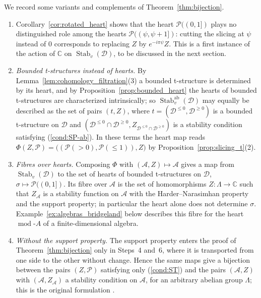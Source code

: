 \documentclass[12pt]{amsart}
\newcommand{\condref}[1]{\textup{(\ref{#1})}}
\newenvironment{remark}{{\textbf{Remark.}}}
\numberwithin{theorem}{section}
\theoremstyle{definition}
\newcommand{\CC}{\mathbb{C}}
\newcommand{\calA}{\mathcal{A}}
\newcommand{\calP}{\mathcal{P}}
\newcommand{\calD}{\mathcal{D}}
\newcommand{\Dle}[1]{\calD^{\leqslant #1}}
\newcommand{\Dge}[1]{\calD^{\geqslant #1}}
\begin{document}
	\begin{remark}
		We record some variants and complements of Theorem~\ref{thm:bijection}.
		\begin{enumerate}
			\item Corollary~\ref{cor:rotated_heart} shows that the heart $\calP((0, 1])$ plays no distinguished role among the hearts $\calP((\psi, \psi + 1])$:
			cutting the slicing at $\psi$ instead of $0$ corresponds to replacing $Z$ by $e^{-i \pi \psi} Z$.
			This is a first instance of the action of $\CC$ on $\operatorname{Stab}_v(\calD)$, to be discussed in the next section.
			\item \emph{Bounded t-structures instead of hearts.}
			By Lemma~\ref{lem:cohomology_filtration}(3) a bounded t-structure is determined by its heart, and by Proposition~\ref{prop:bounded_heart} the hearts of bounded t-structures are characterized intrinsically;
			so $\operatorname{Stab}^{\mathrm{ab}}_v(\calD)$ may equally be described as the set of pairs $(t, Z)$, where $t = (\Dle{0}, \Dge{0})$ is a bounded t-structure on $\calD$ and $(\Dle{0} \cap \Dge{0}, Z_{\Dle{0} \cap \Dge{0}})$ is a stability condition satisfying \condref{cond:SP-ab}.
			In these terms the heart map reads $\Phi(Z, \calP) = \big( (\calP(> 0), \calP(\leqslant 1)), Z \big)$ by Proposition~\ref{prop:slicing_t}(2).
			\item \emph{Fibres over hearts.}
			Composing $\Phi$ with $(\calA, Z) \mapsto \calA$ gives a map from $\operatorname{Stab}_v(\calD)$ to the set of hearts of bounded t-structures on $\calD$, $\sigma \mapsto \calP((0, 1])$.
			Its fibre over $\calA$ is the set of homomorphisms $Z \colon \Lambda \to \CC$ such that $Z_{\calA}$ is a stability function on $\calA$ with the Harder--Narasimhan property and the support property;
			in particular the heart alone does not determine $\sigma$.
			Example~\ref{ex:algebras_bridgeland} below describes this fibre for the heart $\operatorname{mod}\text{-}A$ of a finite-dimensional algebra.
			\item \emph{Without the support property.}
			The support property enters the proof of Theorem~\ref{thm:bijection} only in Steps~4 and~6, where it is transported from one side to the other without change.
			Hence the same maps give a bijection between the pairs $(Z, \calP)$ satisfying only \condref{cond:ST} and the pairs $(\calA, Z)$ with $(\calA, Z_{\calA})$ a stability condition on $\calA$, for an arbitrary abelian group $\Lambda$;
			this is the original formulation \cite[Prop.~5.3]{Bri07}.
		\end{enumerate}
	\end{remark}
\end{document}
